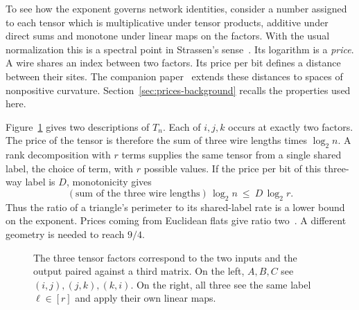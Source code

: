 To see how the exponent governs network identities, consider a number
assigned to each tensor which is multiplicative under tensor products,
additive under direct sums and monotone under linear maps on the
factors. With the usual normalization this is a spectral point in
Strassen's sense~\cite{spectrum}. Its logarithm is a \emph{price}.
A wire shares an index between two factors. Its price per bit defines
a distance between their sites. The companion paper~\cite{oaG}
extends these distances to spaces of nonpositive curvature.
Section~\ref{sec:prices-background} recalls the properties used here.

Figure~\ref{fig:three-wires} gives two descriptions of \(T_n\). Each of \(i,j,k\) occurs at exactly two factors. The
price of the tensor is therefore the sum of three wire lengths
times \(\log_2 n\). A rank decomposition with \(r\) terms supplies
the same tensor from a single shared label, the choice of term, with
\(r\) possible values. If the price per bit of this three-way label
is \(D\), monotonicity gives
\[
      (\text{sum of the three wire lengths})\,\log_2 n
                                     \ \le\ D\,\log_2 r .
\]
Thus the ratio of a triangle's perimeter to its shared-label rate is a
lower bound on the exponent. Prices coming from Euclidean flats give
ratio two~\cite{oaG}. A different geometry is needed to reach \(9/4\).

\begin{figure}[!htbp]
\centering
{}
\caption{The three tensor factors correspond to the two inputs and the
output paired against a third matrix. On the left, \(A,B,C\) see
\((i,j),(j,k),(k,i)\). On the right, all three see the same label
\(\ell\in[r]\) and apply their own linear maps.}\label{fig:three-wires}
\end{figure}

